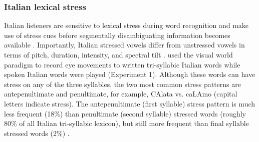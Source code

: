 {\subsubsection{Italian lexical stress}
Italian listeners are sensitive to lexical stress during word recognition and make use of stress cues before segmentally disambiguating information becomes available \citep{Tagliapietra2005, Sulpizio_McQueen_2012}. Importantly, Italian stressed vowels differ from unstressed vowels in terms of pitch, duration, intensity, and spectral tilt \citep{Maturi1998}. \cite{Sulpizio_McQueen_2012} used the visual world paradigm to record eye movements to written tri-syllabic Italian words while spoken Italian words were played (Experiment 1). Although these words can have stress on any of the three syllables, the two most common stress patterns are antepenultimate and penultimate, for example, CAlata vs. caLAmo (capital letters indicate stress). The antepenultimate (first syllable) stress pattern is much less frequent (18\%) than penultimate (second syllable) stressed words (roughly 80\% of all Italian tri-syllabic lexicon), but still more frequent than final syllable stressed words (2\%) \citep{thornton_1997}. 

}
